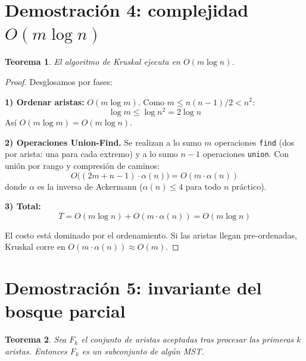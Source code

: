 \documentclass[11pt, letterpaper]{article}
\theoremstyle{definition}
\theoremstyle{plain}
\newtheorem{theorem}{Teorema}[section]
\theoremstyle{remark}
\begin{document}
\section{Demostración 4: complejidad
  \texorpdfstring{$O(m \log n)$}{O(m log n)}}

\begin{theorem}\label{thm:complexity}
El algoritmo de Kruskal ejecuta en $O(m \log n)$.
\end{theorem}

\begin{proof}
Desglosamos por fases:

\textbf{1) Ordenar aristas:} $O(m \log m)$. Como
$m \leq n(n-1)/2 < n^2$:
\[
  \log m \leq \log n^2 = 2\log n
\]
Así $O(m \log m) = O(m \log n)$.

\textbf{2) Operaciones Union-Find.} Se realizan a lo sumo $m$
operaciones \texttt{find} (dos por arista: una para cada extremo) y
a lo sumo $n - 1$ operaciones \texttt{union}. Con unión por rango y
compresión de caminos:
\[
  O\!\big((2m + n - 1) \cdot \alpha(n)\big)
  = O(m \cdot \alpha(n))
\]
donde $\alpha$ es la inversa de Ackermann ($\alpha(n) \leq 4$ para
todo $n$ práctico).

\textbf{3) Total:}
\[
  T = O(m \log n) + O(m \cdot \alpha(n)) = O(m \log n)
\]

El costo está dominado por el ordenamiento. Si las aristas llegan
pre-ordenadas, Kruskal corre en
$O(m \cdot \alpha(n)) \approx O(m)$.
\end{proof}

\section{Demostración 5: invariante del bosque parcial}

\begin{theorem}\label{thm:forest}
Sea $F_k$ el conjunto de aristas aceptadas tras procesar las
primeras $k$ aristas. Entonces $F_k$ es un subconjunto de algún MST.
\end{theorem}
\end{document}
